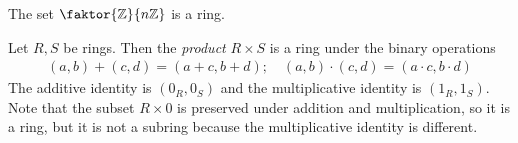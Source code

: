 \begin{example}
	The set $\faktor{\mathbb Z}{n\mathbb Z}$ is a ring.
\end{example}
\begin{example}
	Let $R, S$ be rings.
	Then the \textit{product} $R \times S$ is a ring under the binary operations
	\begin{align*}
		(a,b) + (c,d) = (a+c,b+d);\quad (a,b) \cdot (c,d) = (a\cdot c,b\cdot d)
	\end{align*}
	The additive identity is $(0_R, 0_S)$ and the multiplicative identity is $(1_R, 1_S)$.
	Note that the subset $R \times \qty{0}$ is preserved under addition and multiplication, so it is a ring, but it is not a subring because the multiplicative identity is different.
\end{example}

